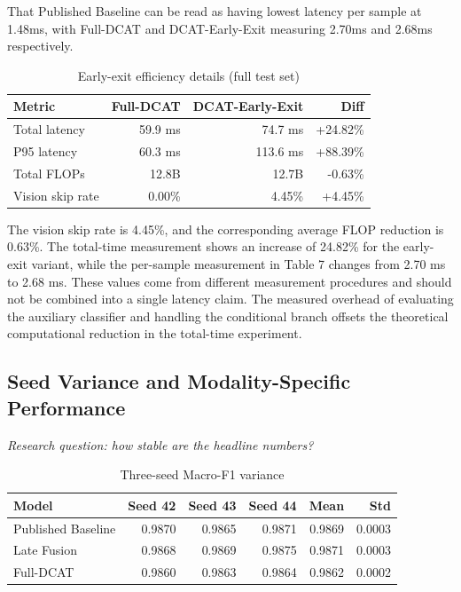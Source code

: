 \documentclass[10pt,twoside]{article}
\begin{document}
That Published Baseline can be read as having lowest latency per sample at 1.48ms, with Full-DCAT and DCAT-Early-Exit measuring 2.70ms and 2.68ms respectively.

\begin{table}[t]
\centering
\caption{Early-exit efficiency details (full test set)}
\label{tab:earlyexit}
\small
\begin{tabular}{lrrr}\toprule
Metric & Full-DCAT & DCAT-Early-Exit & Diff \\
\midrule
Total latency & 59.9 ms & 74.7 ms & +24.82\% \\
P95 latency & 60.3 ms & 113.6 ms & +88.39\% \\
Total FLOPs & 12.8B & 12.7B & -0.63\% \\
Vision skip rate & 0.00\% & 4.45\% & +4.45\% \\
\bottomrule
\end{tabular}

\end{table}

The vision skip rate is 4.45\%, and the corresponding average FLOP reduction is 0.63\%. The total-time measurement shows an increase of 24.82\% for the early-exit variant, while the per-sample measurement in Table 7 changes from 2.70 ms to 2.68 ms. These values come from different measurement procedures and should not be combined into a single latency claim. The measured overhead of evaluating the auxiliary classifier and handling the conditional branch offsets the theoretical computational reduction in the total-time experiment.

\subsection{Seed Variance and Modality-Specific Performance}\label{sec:7.8}

\emph{Research question: how stable are the headline numbers?}

\begin{table}[t]
\centering
\caption{Three-seed Macro-F1 variance}
\label{tab:seeds}
\small
\begin{tabular}{lrrrrr}\toprule
Model & Seed 42 & Seed 43 & Seed 44 & Mean & Std \\
\midrule
Published Baseline & 0.9870 & 0.9865 & 0.9871 & 0.9869 & 0.0003 \\
Late Fusion & 0.9868 & 0.9869 & 0.9875 & 0.9871 & 0.0003 \\
Full-DCAT & 0.9860 & 0.9863 & 0.9864 & 0.9862 & 0.0002 \\
\bottomrule
\end{tabular}

\end{table}
\end{document}
